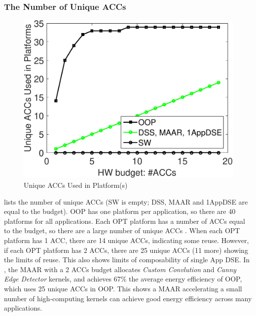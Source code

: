 \subsubsection{The Number of Unique ACCs}
\label{subsubsec:overall-accs}

\begingroup
\setlength{\columnsep}{8pt}%
\begin{figure}
	\begin{center}
		\includegraphics[width=\linewidth]{fig/oopHW.pdf}
	\end{center}
	\caption{Unique ACCs Used in Platform(s)}
	\label{fig:oopHW}
\end{figure}


 lists the number of unique ACCs 
(SW is empty; DSS, MAAR and 1AppDSE are equal to the budget). OOP has one platform per application, so there are 40 platforms for all applications. Each OPT platform has a number of ACCs equal to the budget, so there are a large number of unique ACCs . When each OPT platform has 1 ACC, there are 14 unique ACCs, indicating some reuse. However, if each OPT platform has 2 ACCs, there are 25 unique ACCs (11 more) showing the limits of reuse. This also shows limits of composability of single App DSE. In , the MAAR with a 2 ACCs budget allocates \emph{Custom Convlution} and \emph{Canny Edge Detector} kernels, and achieves 67\% the average energy efficiency of OOP, which uses 25 unique ACCs in OOP. This shows a MAAR accelerating a small number of high-computing kernels can achieve good energy efficiency across many applications.

\endgroup

